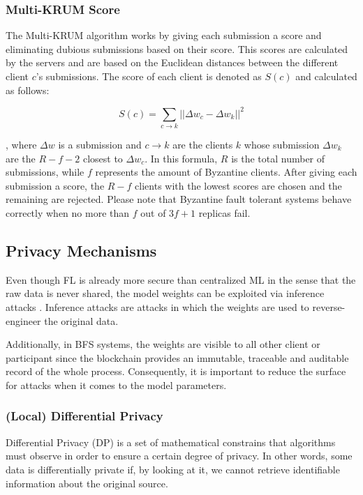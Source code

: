 \subsubsection{Multi-KRUM Score}

The Multi-KRUM algorithm \cite{9170559, Peyvandi2022, 9292450} works by giving each submission a score and eliminating dubious submissions based on their score. This scores are calculated by the servers and are based on the Euclidean distances between the different client $c$'s submissions. The score of each client is denoted as $S(c)$ and calculated as follows:

\begin{equation}
    \label{eq:multi-krum}
    S(c)=\sum_{c \rightarrow k} || \Delta w_c - \Delta w_k|| ^2
\end{equation}

, where $\Delta w$ is a submission and $c \rightarrow k$ are the clients $k$ whose submission $\Delta w_k$ are the $R-f-2$ closest to $\Delta w_c$. In this formula, $R$ is the total number of submissions, while $f$ represents the amount of Byzantine clients. After giving each submission a score, the $R-f$ clients with the lowest scores are chosen and the remaining are rejected. Please note that Byzantine fault tolerant systems behave correctly when no more than $f$ out of $3f+1$ replicas fail.

\subsection{Privacy Mechanisms}

Even though FL is already more secure than centralized ML in the sense that the raw data is never shared, the model weights can be exploited via inference attacks \cite{10.1145/3298981}. Inference attacks are attacks in which the weights are used to reverse-engineer the original data.

Additionally, in BFS systems, the weights are visible to all other client or participant since the blockchain provides an immutable, traceable and auditable record of the whole process. Consequently, it is important to reduce the surface for attacks when it comes to the model parameters.

\subsubsection{(Local) Differential Privacy}\label{background:diff_priv}

Differential Privacy (DP) \cite{hvdiffpriv} is a set of mathematical constrains that algorithms must observe in order to ensure a certain degree of privacy. In other words, some data is differentially private if, by looking at it, we cannot retrieve identifiable information about the original source.

